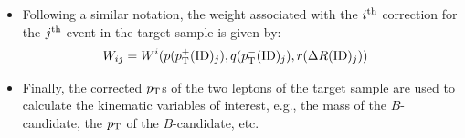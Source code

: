 \begin{itemize}
\begin{align}
        p^-_{\rm T}({\rm Corrected})_{ij} &= p^-_{\rm T}({\rm ID})_j \times (1 + \mathcal{R}^{i}_{p^-_{\rm T}}(p(p^+_{\rm T}({\rm ID})_j),q(p^-_{\rm T}({\rm ID})_j),r(\Delta R({\rm ID})_j)))
    \end{align}
    where we use the notation $p(p^+_{\rm T}({\rm ID})_j)$ to denote the bin of $p^+_{\rm T}({\rm ID})_j$ in the $3{\rm D}$ space of $(p^+_{\rm T}, p^-_{\rm T}, \Delta R)$, and the notation of $\mathcal{R}_{p^+_{\rm T}}^i(p,q,r)$ to denote the $i^{\rm th}$ $\mathcal{R}_{p^+_{\rm T}}$ response in the list $L_R(p,q,r)$. %
    \item Following a similar notation, the weight associated with the $i^{\rm th}$ correction for the $j^{\rm th}$ event in the target sample is given by:
    \begin{align}
        W_{ij} &= W^i(p(p^+_{\rm T}({\rm ID})_j),q(p^-_{\rm T}({\rm ID})_j),r(\Delta R({\rm ID})_j))
    \end{align}
    \item Finally, the corrected $p_{\rm T}$s of the two leptons of the target sample are used to calculate the kinematic variables of interest, e.g., the mass of the $B$-candidate, the $p_{\rm T}$ of the $B$-candidate, etc. 
\end{itemize}
